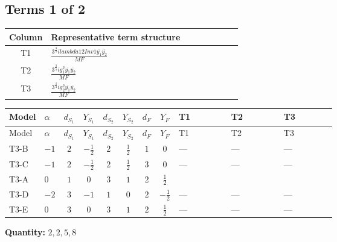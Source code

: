 \documentclass[8pt]{article}
\begin{document}
\begin{landscape}
\subsection*{Terms 1 of 2}
\begin{center}
\begin{tabular}{@{}c >{\raggedright\arraybackslash}p{0.82\linewidth}@{}}
\toprule
Column & Representative term structure \\
\midrule
T1 & \(\displaystyle \frac{3^{\frac{3}{4}} i lambda12Inv1 \overline{y_{1}} \overline{y_{2}}}{MF}\) \\
\midrule
T2 & \(\displaystyle \frac{3^{\frac{3}{4}} i g_{1}^{2} \overline{y_{1}} \overline{y_{2}}}{MF}\) \\
\midrule
T3 & \(\displaystyle \frac{3^{\frac{3}{4}} i g_{2}^{2} \overline{y_{1}} \overline{y_{2}}}{MF}\) \\
\midrule
\bottomrule
\end{tabular}
\end{center}
\smallskip
\tiny
\begin{longtable}{@{}llcccccc >{\raggedright\arraybackslash}p{0.21\linewidth} >{\raggedright\arraybackslash}p{0.21\linewidth} >{\raggedright\arraybackslash}p{0.21\linewidth}@{}}
\toprule
Model & $\alpha$ & $d_{S_1}$ & $Y_{S_1}$ & $d_{S_2}$ & $Y_{S_2}$ & $d_F$ & $Y_F$ & T1 & T2 & T3 \\
\midrule
\endfirsthead
\toprule
Model & $\alpha$ & $d_{S_1}$ & $Y_{S_1}$ & $d_{S_2}$ & $Y_{S_2}$ & $d_F$ & $Y_F$ & T1 & T2 & T3 \\
\midrule
\endhead
T3-B & $-1$ & $2$ & $-\frac{1}{2}$ & $2$ & $\frac{1}{2}$ & $1$ & $0$ & --- & --- & --- \\
\midrule
T3-C & $-1$ & $2$ & $-\frac{1}{2}$ & $2$ & $\frac{1}{2}$ & $3$ & $0$ & --- & --- & --- \\
\midrule
T3-A & $0$ & $1$ & $0$ & $3$ & $1$ & $2$ & $\frac{1}{2}$ & \scriptsize\adjustbox{max width=\linewidth}{$\begin{gathered} \frac{3^{\frac{3}{4}} i lambda12Inv1 \overline{y_{1}} \overline{y_{2}}}{6 MF}\end{gathered}$} & \scriptsize\adjustbox{max width=\linewidth}{$\begin{gathered} \frac{3^{\frac{3}{4}} i g_{1}^{2} \overline{y_{1}} \overline{y_{2}}}{8 MF}\end{gathered}$} & \scriptsize\adjustbox{max width=\linewidth}{$\begin{gathered} \frac{17 \cdot 3^{\frac{3}{4}} i g_{2}^{2} \overline{y_{1}} \overline{y_{2}}}{24 MF}\end{gathered}$} \\
\midrule
T3-D & $-2$ & $3$ & $-1$ & $1$ & $0$ & $2$ & $-\frac{1}{2}$ & --- & --- & --- \\
\midrule
T3-E & $0$ & $3$ & $0$ & $3$ & $1$ & $2$ & $\frac{1}{2}$ & --- & --- & --- \\
\midrule
\bottomrule
\end{longtable}
\clearpage
\noindent\textbf{Quantity: }$\mathrm{2,2,5,8}$\par\smallskip

\end{landscape}
\end{document}
